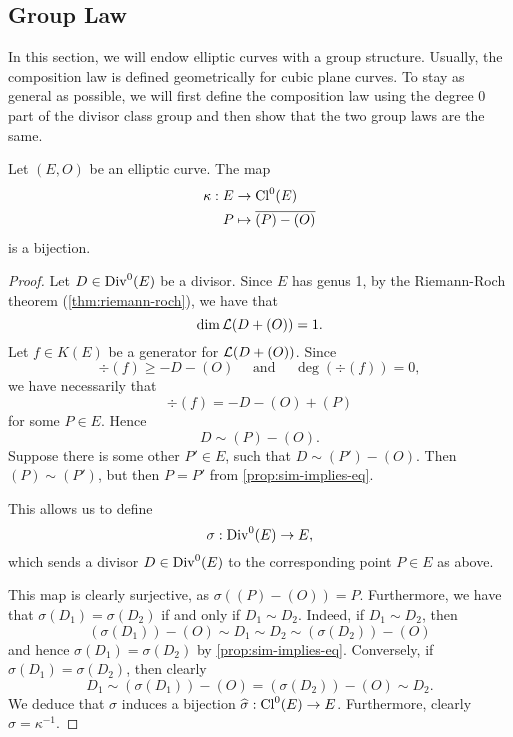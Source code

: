 \subsection{Group Law}

In this section, we will endow elliptic curves with a group structure.
Usually, the composition law is defined geometrically for cubic plane curves.
To stay as general as possible, we will first define the composition law
using the degree 0 part of the divisor class group and then show that
the two group laws are the same.

\begin{proposition}
	Let $(E, O)$ be an elliptic curve. The map
	\begin{align*}
		\kappa: E &\to \operatorname{Cl}^0(E)\\
		P &\mapsto \overline{(P) - (O)}
	\end{align*}
	is a bijection.
\end{proposition}

\begin{proof}
	Let $D \in \operatorname{Div}^0(E)$ be a divisor. Since $E$ has genus 1, 
	by the Riemann-Roch theorem (\ref{thm:riemann-roch}), we have that
	\begin{equation*}
		\dim\mathcal{L}(D + (O)) = 1.
	\end{equation*}
	Let $f \in K(E)$ be a generator for $\mathcal{L}(D + (O))$. Since
	\begin{equation*}
		\div(f) \geq -D -(O)
		\quad\textrm{ and }\quad
		\deg(\div(f)) = 0,
	\end{equation*}
	we have necessarily that 
	\begin{equation*}
		\div(f) = -D -(O) + (P)
	\end{equation*}
	for some $P \in E$.
	Hence 
	\begin{equation*}
		D \sim (P) - (O).
	\end{equation*}
	Suppose there is some other $P' \in E$, such that $D \sim (P') - (O)$.
	Then $(P) \sim (P')$, but then $P = P'$ from \ref{prop:sim-implies-eq}.
	
	This allows us to define
	\begin{equation*}
		\sigma: \operatorname{Div}^0(E) \to E,
	\end{equation*}
	which sends a divisor $D \in \operatorname{Div}^0(E)$ to the corresponding point $P \in E$
	as above.

	This map is clearly surjective, as $\sigma((P) - (O)) = P$. Furthermore, we
	have that $\sigma(D_1) = \sigma(D_2)$ if and only if $D_1 \sim D_2$.
	Indeed, if $D_1 \sim D_2$, then 
	\begin{equation*}
		(\sigma(D_1)) - (O) \sim D_1 \sim D_2 \sim (\sigma(D_2)) - (O)
	\end{equation*}	
	and hence $\sigma(D_1) = \sigma(D_2)$ by \ref{prop:sim-implies-eq}.
	Conversely, if $\sigma(D_1) = \sigma(D_2)$, then clearly
	\begin{equation*}
		D_1 \sim (\sigma(D_1)) - (O) = (\sigma(D_2)) - (O) \sim D_2.
	\end{equation*}
	We deduce that $\sigma$ induces a bijection $\widehat{\sigma}: \operatorname{Cl}^0(E) \to E$.
	Furthermore, clearly $\widehat{\sigma} = \kappa^{-1}$.
\end{proof}

